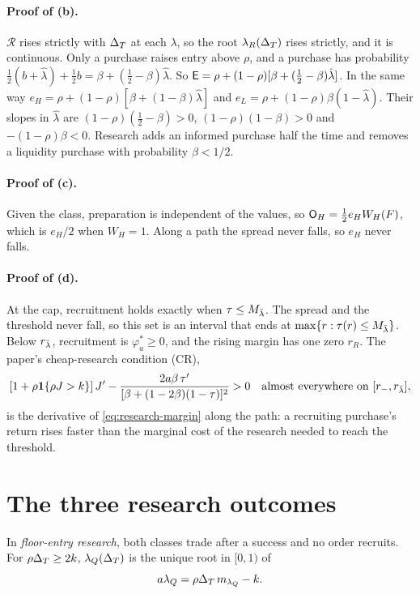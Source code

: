 \paragraph{Proof of (b).} \(\mathcal R\) rises strictly with \(\Delta_T\) at each \(\lambda\), so the root \(\lambda_R(\Delta_T)\)
rises strictly, and it is continuous. Only a purchase raises entry above \(\rho\), and a purchase has probability
\(\tfrac12(b+\hat\lambda)+\tfrac12 b=\beta+(\tfrac12-\beta)\hat\lambda\). So
\(\mathsf{E}=\rho+(1-\rho)[\beta+(\tfrac12-\beta)\hat\lambda]\). In the same way \(e_H=\rho+(1-\rho)[\beta+(1-\beta)\hat\lambda]\) and \(e_L=\rho+(1-\rho)\beta(1-\hat\lambda)\). Their
slopes in \(\hat\lambda\) are \((1-\rho)(\tfrac12-\beta)>0\), \((1-\rho)(1-\beta)>0\) and \(-(1-\rho)\beta<0\). Research adds an
informed purchase half the time and removes a liquidity purchase with probability \(\beta<1/2\).

\paragraph{Proof of (c).} Given the class, preparation is independent of the values, so \(\mathsf{O}_H=\tfrac12e_HW_H(F)\),
which is \(e_H/2\) when \(W_H=1\). Along a path the spread never falls, so \(e_H\) never falls.

\paragraph{Proof of (d).} At the cap, recruitment holds exactly when \(\tau\le M_{\bar\lambda}\). The spread and the threshold
never fall, so this set is an interval that ends at \(\max\{r:\tau(r)\le M_{\bar\lambda}\}\). Below \(r_{\bar\lambda}\), recruitment is
\(\varphi_a^*\ge0\), and the rising margin has one zero \(r_R\). The paper's cheap-research condition (CR),
\[
[1+\rho\mathbf{1}\{\rho J>k\}]\,J'-\frac{2a\beta\,\tau'}{[\beta+(1-2\beta)(1-\tau)]^2}>0
\quad\text{almost everywhere on }[r_-,r_{\bar\lambda}],
\]
is the derivative of \eqref{eq:research-margin} along the path: a recruiting purchase's return rises faster than the
marginal cost of the research needed to reach the threshold.

\section{The three research outcomes}\label{sec:research-outcomes}

In \emph{floor-entry research}, both classes trade after a success and no order recruits. For \(\rho\Delta_T\ge2k\), \(\lambda_Q(\Delta_T)\) is the unique root in
\([0,1)\) of
\begin{equation}\label{eq:research-floor}
a\lambda_Q=\rho\Delta_T\,m_{\lambda_Q}-k .
\end{equation}


